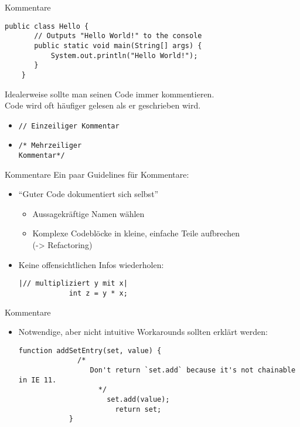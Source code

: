 \begin{frame}[fragile]{Kommentare}
    \begin{lstlisting}[gobble=4]
    public class Hello {
       // Outputs "Hello World!" to the console
       public static void main(String[] args) {
           System.out.println("Hello World!");
       }
    }\end{lstlisting}
   Idealerweise sollte man seinen Code immer kommentieren. \\
   Code wird oft häufiger gelesen als er geschrieben wird.
   \begin{itemize}
       \item \texttt{// Einzeiliger Kommentar}
       \item \texttt{/* Mehrzeiliger \\
           Kommentar*/}
   \end{itemize}
\end{frame}

\begin{frame}[fragile]{Kommentare}
    Ein paar Guidelines für Kommentare:
    \begin{itemize}[<+->]
        \item \enquote{Guter Code dokumentiert sich selbst}
            \begin{itemize}
                \item Aussagekräftige Namen wählen
                \item Komplexe Codeblöcke in kleine, einfache Teile aufbrechen \\ 
                    (-> Refactoring)
            \end{itemize}
        \item Keine offensichtlichen Infos wiederholen:
            \begin{lstlisting}[gobble=12]
            |// multipliziert y mit x|
            int z = y * x;\end{lstlisting}
    \end{itemize}
\end{frame}

\begin{frame}[fragile]{Kommentare}
    \begin{itemize}[<+->] 
        \item Notwendige, aber nicht intuitive Workarounds sollten erklärt werden:\footnotemark
            \begin{lstlisting}[gobble=12]
            function addSetEntry(set, value) {   
              /* 
                 Don't return `set.add` because it's not chainable in IE 11.
                   */  
                     set.add(value);    
                       return set;  
            }\end{lstlisting}
    \end{itemize}
\end{frame}

